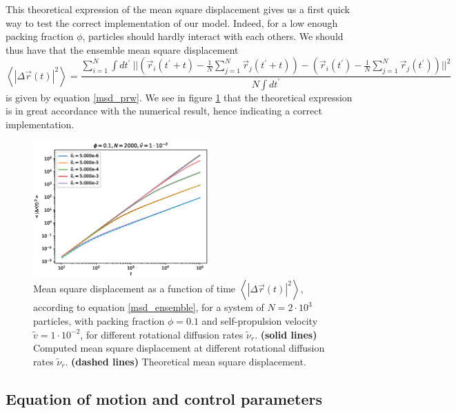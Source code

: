 \documentclass[class=report, float=false, crop=false]{standalone}
\begin{document}
This theoretical expression of the mean square displacement gives us a first quick way to test the correct implementation of our model. Indeed, for a low enough packing fraction $\phi$, particles should hardly interact with each others. We should thus have that the ensemble mean square displacement
\begin{equation}
\left<|\Delta\vec{r}(t)|^2\right> = \frac{\sum_{i=1}^N \int dt^{\prime}~ ||\left(\vec{r}_i(t^{\prime} + t) - \frac{1}{N}\sum_{j=1}^N\vec{r}_j(t^{\prime} + t)\right) - \left(\vec{r}_i(t^{\prime}) - \frac{1}{N}\sum_{j=1}^N \vec{r}_j(t^{\prime})\right)||^2}{N \int dt^{\prime}}
\label{msd_ensemble}
\end{equation}
is given by equation \ref{msd_prw}. We see in figure \ref{msd_ensemble_fit} that the theoretical expression is in great accordance with the numerical result, hence indicating a correct implementation.

\begin{figure}[H]
\centering
\includegraphics[width=0.6\textwidth]{figures/figs/msd_Dk1000_Vj1000_No2000.eps}
\caption{Mean square displacement as a function of time $\left<|\Delta\vec{r}(t)|^2\right>$, according to equation \ref{msd_ensemble}, for a system of $N=2\cdot10^3$ particles, with packing fraction $\phi=0.1$ and self-propulsion velocity $\tilde{v}=1\cdot10^{-2}$, for different rotational diffusion rates $\tilde{\nu}_r$. \textbf{(solid lines)} Computed mean square displacement at different rotational diffusion rates $\tilde{\nu}_r$. \textbf{(dashed lines)} Theoretical mean square displacement.}
\label{msd_ensemble_fit}
\end{figure}

\subsection{Equation of motion and control parameters}
\end{document}
